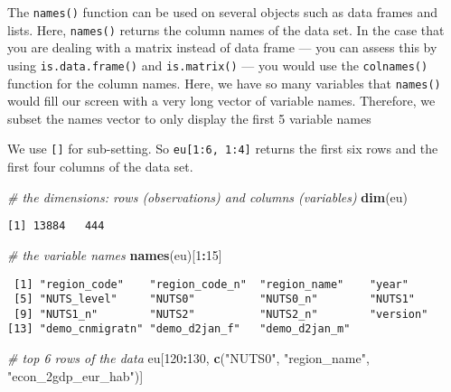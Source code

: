 \documentclass[]{article}
\newenvironment{Shaded}{\begin{snugshade}}{\end{snugshade}}
\newcommand{\CommentTok}[1]{\textcolor[rgb]{0.56,0.35,0.01}{\textit{#1}}}
\newcommand{\DecValTok}[1]{\textcolor[rgb]{0.00,0.00,0.81}{#1}}
\newcommand{\KeywordTok}[1]{\textcolor[rgb]{0.13,0.29,0.53}{\textbf{#1}}}
\newcommand{\NormalTok}[1]{#1}
\newcommand{\OperatorTok}[1]{\textcolor[rgb]{0.81,0.36,0.00}{\textbf{#1}}}
\newcommand{\StringTok}[1]{\textcolor[rgb]{0.31,0.60,0.02}{#1}}
\begin{document}
The \texttt{names()} function can be used on several objects such as data frames and lists. Here, \texttt{names()} returns the column names of the data set. In the case that you are dealing with a matrix instead of data frame --- you can assess this by using \texttt{is.data.frame()} and \texttt{is.matrix()} --- you would use the \texttt{colnames()} function for the column names. Here, we have so many variables that \texttt{names()} would fill our screen with a very long vector of variable names. Therefore, we subset the names vector to only display the first 5 variable names

We use \texttt{{[}{]}} for sub-setting. So \texttt{eu{[}1:6,\ 1:4{]}} returns the first six rows and the first four columns of the data set.

\begin{Shaded}
\begin{Highlighting}[]
\CommentTok{# the dimensions: rows (observations) and columns (variables) }
\KeywordTok{dim}\NormalTok{(eu)}
\end{Highlighting}
\end{Shaded}

\begin{verbatim}
[1] 13884   444
\end{verbatim}

\begin{Shaded}
\begin{Highlighting}[]
\CommentTok{# the variable names}
\KeywordTok{names}\NormalTok{(eu)[}\DecValTok{1}\OperatorTok{:}\DecValTok{15}\NormalTok{]}
\end{Highlighting}
\end{Shaded}

\begin{verbatim}
 [1] "region_code"    "region_code_n"  "region_name"    "year"          
 [5] "NUTS_level"     "NUTS0"          "NUTS0_n"        "NUTS1"         
 [9] "NUTS1_n"        "NUTS2"          "NUTS2_n"        "version"       
[13] "demo_cnmigratn" "demo_d2jan_f"   "demo_d2jan_m"  
\end{verbatim}

\begin{Shaded}
\begin{Highlighting}[]
\CommentTok{# top 6 rows of the data}
\NormalTok{eu[}\DecValTok{120}\OperatorTok{:}\DecValTok{130}\NormalTok{, }\KeywordTok{c}\NormalTok{(}\StringTok{"NUTS0"}\NormalTok{, }\StringTok{"region_name"}\NormalTok{, }\StringTok{"econ_2gdp_eur_hab"}\NormalTok{)]}
\end{Highlighting}
\end{Shaded}
\end{document}
